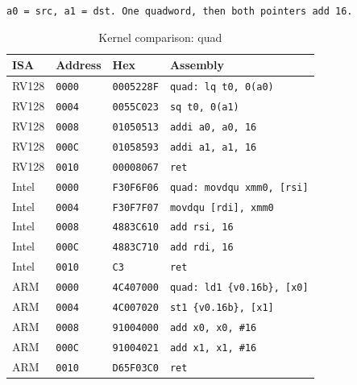 \begin{table}[htbp]
\centering
\caption{Kernel comparison: quad}
\begingroup
\scriptsize
\setlength{\tabcolsep}{4pt}
\noindent \texttt{a0 = src, a1 = dst. One quadword, then both pointers add 16.}\par
\vspace{0.6ex}
\begin{tabular}{@{}l|l|l|p{7.2cm}@{}}
\toprule
ISA & Address & Hex & Assembly \\
\midrule
RV128 & \texttt{0000} & \texttt{0005228F} & \texttt{quad: lq t0, 0(a0)} \\
RV128 & \texttt{0004} & \texttt{0055C023} & \texttt{sq t0, 0(a1)} \\
RV128 & \texttt{0008} & \texttt{01050513} & \texttt{addi a0, a0, 16} \\
RV128 & \texttt{000C} & \texttt{01058593} & \texttt{addi a1, a1, 16} \\
RV128 & \texttt{0010} & \texttt{00008067} & \texttt{ret} \\
\midrule
Intel & \texttt{0000} & \texttt{F30F6F06} & \texttt{quad: movdqu xmm0, [rsi]} \\
Intel & \texttt{0004} & \texttt{F30F7F07} & \texttt{movdqu [rdi], xmm0} \\
Intel & \texttt{0008} & \texttt{4883C610} & \texttt{add rsi, 16} \\
Intel & \texttt{000C} & \texttt{4883C710} & \texttt{add rdi, 16} \\
Intel & \texttt{0010} & \texttt{C3} & \texttt{ret} \\
\midrule
ARM & \texttt{0000} & \texttt{4C407000} & \texttt{quad: ld1 \{v0.16b\}, [x0]} \\
ARM & \texttt{0004} & \texttt{4C007020} & \texttt{st1 \{v0.16b\}, [x1]} \\
ARM & \texttt{0008} & \texttt{91004000} & \texttt{add x0, x0, \#16} \\
ARM & \texttt{000C} & \texttt{91004021} & \texttt{add x1, x1, \#16} \\
ARM & \texttt{0010} & \texttt{D65F03C0} & \texttt{ret} \\
\bottomrule
\end{tabular}
\endgroup
\end{table}
\noindent{}\par
